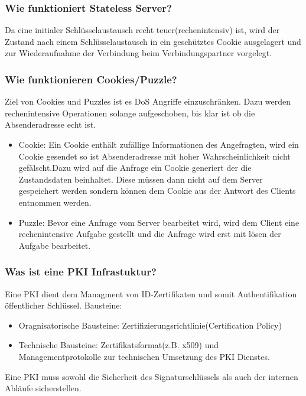 	\subsubsection{Wie funktioniert Stateless Server?}
	Da eine initialer Schlüsselaustausch recht teuer(rechenintensiv) ist, wird der Zustand nach einem Schlüsselaustausch in ein geschütztes Cookie ausgelagert und zur Wiederaufnahme der Verbindung beim Verbindungspartner vorgelegt.
	
	\subsubsection{Wie funktionieren Cookies/Puzzle?}
	Ziel von Cookies und Puzzles ist es DoS Angriffe einzuschränken. Dazu werden rechenintensive Operationen solange aufgeschoben, bis klar ist ob die Absenderadresse echt ist. 
	\begin{itemize}
		\item Cookie: Ein Cookie enthält zufällige Informationen des Angefragten, wird ein Cookie gesendet so ist Absenderadresse mit hoher Wahrscheinlichkeit nicht gefälscht.Dazu wird auf die Anfrage ein Cookie generiert der die Zustandsdaten beinhaltet. Diese müssen dann nicht auf dem Server gespeichert werden sondern können dem Cookie aus der Antwort des Clients entnommen werden.
		\item Puzzle: Bevor eine Anfrage vom Server bearbeitet wird, wird dem Client eine rechenintensive Aufgabe gestellt und die Anfrage wird erst mit lösen der Aufgabe bearbeitet.
	\end{itemize}
	
	
	
	
	\subsubsection{Was ist eine PKI Infrastuktur?}
	Eine PKI dient dem Managment von ID-Zertifikaten und somit Authentifikation öffentlicher Schlüssel.
	Bausteine: 
	\begin{itemize}
		\item Oragnisatorische Bausteine: Zertifizierungsrichtlinie(Certification Policy)
		\item Technische Bausteine: Zertifikatsformat(z.B. x509) und Managementprotokolle zur technischen Umsetzung des PKI Dienstes.
	\end{itemize}
	Eine PKI muss sowohl die Sicherheit des Signaturschlüssels als auch der internen Abläufe sicherstellen.
	
